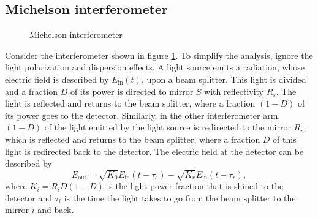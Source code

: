 \documentclass[12pt,twoside,english]{book}
\renewcommand{\~}{\perispomeni}%
\numberwithin{equation}{section}
\numberwithin{figure}{section}
\begin{document}
\subsection{Michelson interferometer}
\label{sub:Michelson interferometer}
%
\begin{figure}[h]
\center{}
\caption{Michelson interferometer\label{fig:Michelson-interferometer}}
\end{figure}
Consider the interferometer shown in figure \ref{fig:Michelson-interferometer}. To simplify the analysis, ignore the light polarization and dispersion effects. A light source emits a radiation, whose electric field is described by $E_{\text{in}}\left(t\right)$, upon a beam splitter. This light is divided and a fraction $D$ of its power is directed to mirror $S$ with reflectivity $R_{s}$. The light is reflected and returns to the beam splitter, where a fraction $\left(1-D\right)$ of its power goes to the detector. Similarly, in the other interferometer arm, $\left(1-D\right)$ of the light emitted by the light source is redirected to the mirror $R_{r}$, which is reflected and returns to the beam splitter, where a fraction $D$ of this light is redirected back to the detector. The electric field at the detector can be described by
\begin{equation}
E_{\text{out}}=\sqrt{K_{0}}E_{\text{in}}\left(t-\tau_{s}\right)-\sqrt{K_{r}}E_{\text{in}}\left(t-\tau_{r}\right),\label{eq:Simplest Field equation}
\end{equation}
where $K_{i}=R_{i}D\left(1-D\right)$ is the light power fraction that is shined to the detector and $\tau_{i}$ is the time the light takes to go from the beam splitter to the mirror $i$ and back.
\end{document}
